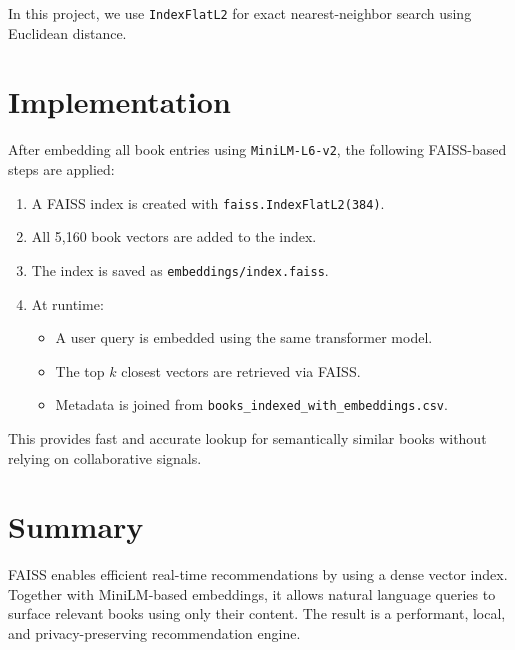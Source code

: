 In this project, we use \texttt{IndexFlatL2} for exact nearest-neighbor search using Euclidean distance.

\section{Implementation}
\label{sec:similarity-implementation}

After embedding all book entries using \texttt{MiniLM-L6-v2}, the following FAISS-based steps are applied:

\begin{enumerate}
    \item A FAISS index is created with \texttt{faiss.IndexFlatL2(384)}.
    \item All 5,160 book vectors are added to the index.
    \item The index is saved as \texttt{embeddings/index.faiss}.
    \item At runtime:
    \begin{itemize}
        \item A user query is embedded using the same transformer model.
        \item The top $k$ closest vectors are retrieved via FAISS.
        \item Metadata is joined from \texttt{books\_indexed\_with\_embeddings.csv}.
    \end{itemize}
\end{enumerate}

This provides fast and accurate lookup for semantically similar books without relying on collaborative signals.

\section{Summary}
\label{sec:similarity-summary}

FAISS enables efficient real-time recommendations by using a dense vector index. Together with MiniLM-based embeddings, it allows natural language queries to surface relevant books using only their content. The result is a performant, local, and privacy-preserving recommendation engine.
